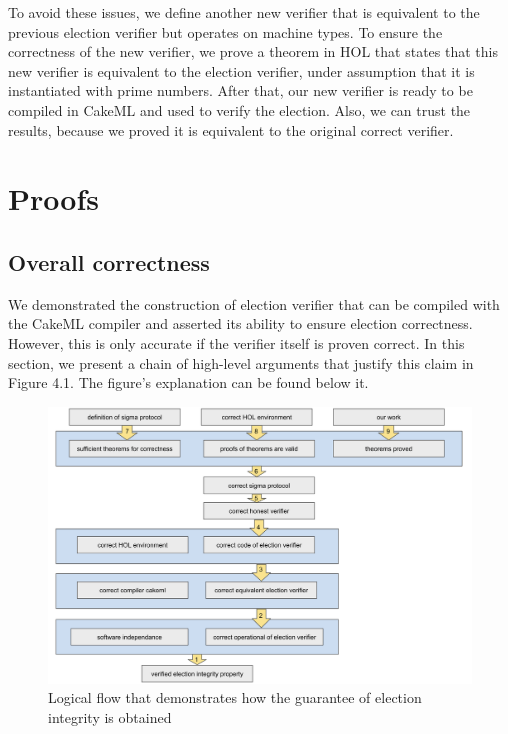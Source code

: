    To avoid these issues, we define another new verifier that is equivalent to the previous election verifier but operates on machine types. To ensure the correctness of the new verifier, we prove a theorem in HOL that states that this new verifier is equivalent to the election verifier, under assumption that it is instantiated with prime numbers. After that, our new verifier is ready to be compiled in CakeML and used to verify the election. Also, we can trust the results, because we proved it is equivalent to the original correct verifier.
    

    \section{Proofs}
        \subsection{Overall correctness}
        We demonstrated the construction of election verifier that can be compiled with the CakeML compiler and asserted its ability to ensure election correctness. However, this is only accurate if the verifier itself is proven correct. In this section, we present a chain of high-level arguments that justify this claim in Figure 4.1. The figure's explanation can be found below it.



\begin{figure}[th!]
  \includegraphics[width=15cm]{figures/proof_graph.png}
  \caption{Logical flow that demonstrates how the guarantee of election integrity is obtained}
\end{figure}%


